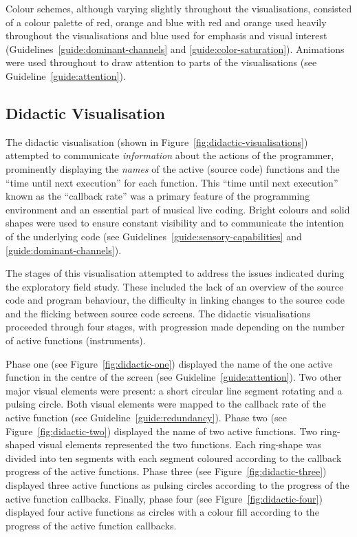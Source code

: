 Colour schemes, although varying slightly throughout the visualisations, consisted of a colour palette of red, orange and blue with red and orange used heavily throughout the visualisations and blue used for emphasis and visual interest (Guidelines~\ref{guide:dominant-channels} and \ref{guide:color-saturation}). Animations were used throughout to draw attention to parts of the visualisations (see Guideline~\ref{guide:attention}).



\subsection{Didactic Visualisation}
\label{sec:didactic-visualisation}

The didactic visualisation (shown in Figure~\ref{fig:didactic-visualisations}) attempted to communicate \emph{information} about the actions of the programmer, prominently displaying the \emph{names} of the active (source code) functions and the ``time until next execution'' for each function. This ``time until next execution'' known as the ``callback rate'' was a primary feature of the programming environment and an essential part of musical live coding. Bright colours and solid shapes were used to ensure constant visibility and to communicate the intention of the underlying code (see Guidelines~\ref{guide:sensory-capabilities} and \ref{guide:dominant-channels}). 

The stages of this visualisation attempted to address the issues indicated during the exploratory field study. These included the lack of an overview of the source code and program behaviour, the difficulty in linking changes to the source code and the flicking between source code screens. The didactic visualisations proceeded through four stages, with progression made depending on the number of active functions (instruments).

Phase one (see Figure~\ref{fig:didactic-one}) displayed the name of the one active function in the centre of the screen (see Guideline~\ref{guide:attention}). Two other major visual elements were present: a short circular line segment rotating and a pulsing circle. Both visual elements were mapped to the callback rate of the active function (see Guideline~\ref{guide:redundancy}). Phase two (see Figure~\ref{fig:didactic-two}) displayed the name of two active functions. Two ring-shaped visual elements represented the two functions. Each ring-shape was divided into ten segments with each segment coloured according to the callback progress of the active functions. Phase three (see Figure~\ref{fig:didactic-three}) displayed three active functions as pulsing circles according to the progress of the active function callbacks. Finally, phase four (see Figure~\ref{fig:didactic-four}) displayed four active functions as circles with a colour fill according to the progress of the active function callbacks.

